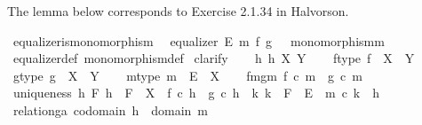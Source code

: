 \begin{isabellebody}
\isamarkupfalse%
%
\endisatagproof
{\isafoldproof}%
%
\isadelimproof
%
\endisadelimproof
%
\begin{isamarkuptext}%
The lemma below corresponds to Exercise 2.1.34 in Halvorson.%
\end{isamarkuptext}\isamarkuptrue%
\isamarkupfalse%
\ equalizer{\isacharunderscore}{\kern0pt}is{\isacharunderscore}{\kern0pt}monomorphism{\isacharcolon}{\kern0pt}\isanewline
\ \ {\isachardoublequoteopen}equalizer\ E\ m\ f\ g\ {\isasymLongrightarrow}\ \ monomorphism{\isacharparenleft}{\kern0pt}m{\isacharparenright}{\kern0pt}{\isachardoublequoteclose}\isanewline
%
\isadelimproof
\ \ %
\endisadelimproof
%
\isatagproof
{}\isamarkupfalse%
\ equalizer{\isacharunderscore}{\kern0pt}def\ monomorphism{\isacharunderscore}{\kern0pt}def\isanewline
{}\isamarkupfalse%
\ clarify\isanewline
\ \ \isamarkupfalse%
\ h{}\ h{}\ X\ Y\isanewline
\ \ \isamarkupfalse%
\ f{\isacharunderscore}{\kern0pt}type{\isacharcolon}{\kern0pt}\ {\isachardoublequoteopen}f\ {\isacharcolon}{\kern0pt}\ X\ {\isasymrightarrow}\ Y{\isachardoublequoteclose}\isanewline
\ \ \isamarkupfalse%
\ g{\isacharunderscore}{\kern0pt}type{\isacharcolon}{\kern0pt}\ {\isachardoublequoteopen}g\ {\isacharcolon}{\kern0pt}\ X\ {\isasymrightarrow}\ Y{\isachardoublequoteclose}\isanewline
\ \ \isamarkupfalse%
\ m{\isacharunderscore}{\kern0pt}type{\isacharcolon}{\kern0pt}\ {\isachardoublequoteopen}m\ {\isacharcolon}{\kern0pt}\ E\ {\isasymrightarrow}\ X{\isachardoublequoteclose}\isanewline
\ \ \isamarkupfalse%
\ fm{\isacharunderscore}{\kern0pt}gm{\isacharcolon}{\kern0pt}\ {\isachardoublequoteopen}f\ {\isasymcirc}\isactrlsub c\ m\ {\isacharequal}{\kern0pt}\ g\ {\isasymcirc}\isactrlsub c\ m{\isachardoublequoteclose}\isanewline
\ \ \isamarkupfalse%
\ uniqueness{\isacharcolon}{\kern0pt}\ {\isachardoublequoteopen}{\isasymforall}h\ F{\isachardot}{\kern0pt}\ h\ {\isacharcolon}{\kern0pt}\ F\ {\isasymrightarrow}\ X\ {\isasymand}\ f\ {\isasymcirc}\isactrlsub c\ h\ {\isacharequal}{\kern0pt}\ g\ {\isasymcirc}\isactrlsub c\ h\ {\isasymlongrightarrow}\ {\isacharparenleft}{\kern0pt}{\isasymexists}{\isacharbang}{\kern0pt}k{\isachardot}{\kern0pt}\ k\ {\isacharcolon}{\kern0pt}\ F\ {\isasymrightarrow}\ E\ {\isasymand}\ m\ {\isasymcirc}\isactrlsub c\ k\ {\isacharequal}{\kern0pt}\ h{\isacharparenright}{\kern0pt}{\isachardoublequoteclose}\isanewline
\ \ \isamarkupfalse%
\ relation{\isacharunderscore}{\kern0pt}ga{\isacharcolon}{\kern0pt}\ {\isachardoublequoteopen}codomain\ h{}\ {\isacharequal}{\kern0pt}\ domain\ m{\isachardoublequoteclose}\isanewline

\end{isabellebody}
